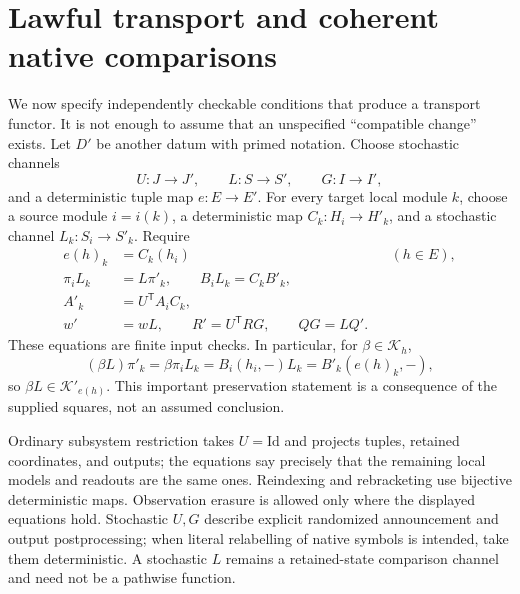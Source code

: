 \documentclass[11pt]{article}
\newcommand{\Kcal}{\mathcal K}
\theoremstyle{remark}
\begin{document}
\section{Lawful transport and coherent native comparisons}\label{sec:transport}

We now specify independently checkable conditions that produce a transport functor. It is not enough to assume that an unspecified ``compatible change'' exists. Let $D'$ be another datum with primed notation. Choose stochastic channels
\[
 U:J\to J',\qquad L:S\to S',\qquad G:I\to I',
\]
and a deterministic tuple map $e:E\to E'$. For every target local module $k$, choose a source module $i=i(k)$, a deterministic map $C_k:H_i\to H'_k$, and a stochastic channel $L_k:S_i\to S'_k$. Require
\begin{align}
 e(h)_k&=C_k(h_i) &&(h\in E),\label{eq:transport-tuple}\\
 \pi_iL_k&=L\pi'_k,\qquad B_iL_k=C_kB'_k,\label{eq:transport-rows}\\
 A'_k&=U^{\mathsf T}A_iC_k,\label{eq:transport-root}\\
 w'&=wL,\qquad R'=U^{\mathsf T}RG,\qquad QG=LQ'.\label{eq:transport-global}
\end{align}
These equations are finite input checks. In particular, for $\beta\in\Kcal_h$,
\begin{equation}\label{eq:Ktransport}
 (\beta L)\pi'_k=\beta\pi_iL_k
 =B_i(h_i,-)L_k=B'_k(e(h)_k,-),
\end{equation}
so $\beta L\in\Kcal'_{e(h)}$. This important preservation statement is a consequence of the supplied squares, not an assumed conclusion.

Ordinary subsystem restriction takes $U=\mathrm{Id}$ and projects tuples, retained coordinates, and outputs; the equations say precisely that the remaining local models and readouts are the same ones. Reindexing and rebracketing use bijective deterministic maps. Observation erasure is allowed only where the displayed equations hold. Stochastic $U,G$ describe explicit randomized announcement and output postprocessing; when literal relabelling of native symbols is intended, take them deterministic. A stochastic $L$ remains a retained-state comparison channel and need not be a pathwise function.
\end{document}
